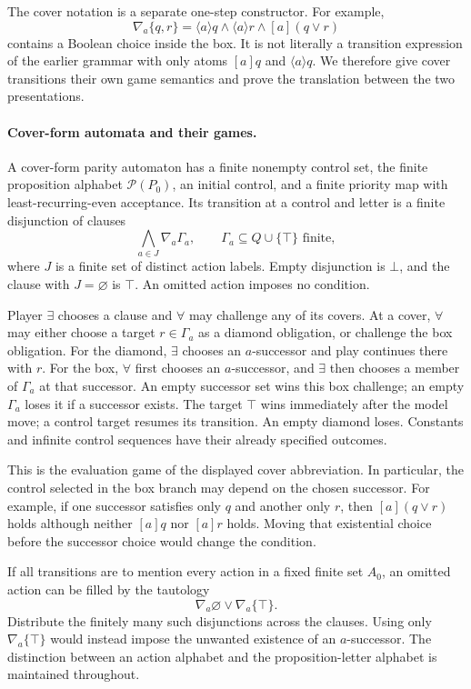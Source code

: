 The cover notation is a separate
one-step constructor. For example,
\[
 \nabla_a\{q,r\}
   =\langle a\rangle q\land
     \langle a\rangle r\land[a](q\lor r)
\]
contains a Boolean choice inside
the box. It is not literally a
transition expression of the earlier
grammar with only atoms \([a]q\)
and \(\langle a\rangle q\).
We therefore give cover transitions
their own game semantics and prove
the translation between the two
presentations.

\paragraph{Cover-form automata and their games.}
A cover-form parity automaton has
a finite nonempty control set,
the finite proposition alphabet
\(\mathcal P(P_0)\), an initial
control, and a finite priority map
with least-recurring-even acceptance.
Its transition at a control and
letter is a finite disjunction
of clauses
\[
 \bigwedge_{a\in J}\nabla_a\Gamma_a,
 \qquad
 \Gamma_a\subseteq Q\cup\{\top\}\text{ finite},
\]
where \(J\) is a finite set of
distinct action labels. Empty
disjunction is \(\bot\), and
the clause with \(J=\varnothing\)
is \(\top\). An omitted action
imposes no condition.

Player \(\exists\) chooses a clause
and \(\forall\) may challenge any
of its covers. At a cover, \(\forall\)
may either choose a target
\(r\in\Gamma_a\) as a diamond
obligation, or challenge the box
obligation. For the diamond,
\(\exists\) chooses an \(a\)-successor
and play continues there with \(r\).
For the box, \(\forall\) first
chooses an \(a\)-successor, and
\(\exists\) then chooses a member
of \(\Gamma_a\) at that successor.
An empty successor set wins this
box challenge; an empty
\(\Gamma_a\) loses it if a
successor exists.
The target \(\top\) wins immediately
after the model move; a control
target resumes its transition.
An empty diamond loses.
Constants and infinite control
sequences have their already
specified outcomes.

This is the evaluation game of
the displayed cover abbreviation.
In particular, the control selected
in the box branch may depend on
the chosen successor.
For example, if one successor
satisfies only \(q\) and another
only \(r\), then \([a](q\lor r)\)
holds although neither \([a]q\)
nor \([a]r\) holds. Moving that
existential choice before the
successor choice would change
the condition.

If all transitions are to mention
every action in a fixed finite
set \(A_0\), an omitted action
can be filled by the tautology
\[
 \nabla_a\varnothing\lor\nabla_a\{\top\}.
\]
Distribute the finitely many such
disjunctions across the clauses.
Using only \(\nabla_a\{\top\}\)
would instead impose the unwanted
existence of an \(a\)-successor.
The distinction between an action
alphabet and the proposition-letter
alphabet is maintained throughout.

